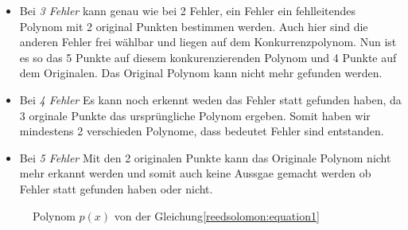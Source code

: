 \begin{beispiel}
\begin{itemize}
        Da der zweite Fehler frei wählbar ist, kann dieser auch auf dem Konkurrenzpolynom liegen, wie in der Abbilbung \ref{fig:polynom}.
        Nun haben wir, ein originles Polynom mit 5 übereinstimmenden und eine konkurrenzierendes mit 4 Punkten.
        Da 5 noch grösser als 4 ist, können wir sagen, welches das original Polynom ist.
    \item Bei \textit{3 Fehler} kann genau wie bei 2 Fehler, ein Fehler ein fehlleitendes Polynom mit 2 original Punkten bestimmen werden.
        Auch hier sind die anderen Fehler frei wählbar und liegen auf dem Konkurrenzpolynom.
        Nun ist es so das 5 Punkte auf diesem konkurenzierenden Polynom und 4 Punkte auf dem Originalen.
        Das Original Polynom kann nicht mehr gefunden werden.
    \item Bei \textit{4 Fehler} Es kann noch erkennt weden das Fehler statt gefunden haben, da 3 orginale Punkte das ursprüngliche Polynom ergeben.
        Somit haben wir mindestens 2 verschieden Polynome, dass bedeutet Fehler sind entstanden.
    \item Bei \textit{5 Fehler} Mit den 2 originalen Punkte kann das Originale Polynom nicht mehr erkannt werden und 
        somit auch keine Aussgae gemacht werden ob Fehler statt gefunden haben oder nicht.
\end{itemize}

\begin{figure}%
	\centering
    
	\caption{Polynom $p(x)$ von der Gleichung\eqref{reedsolomon:equation1}}
	\label{fig:polynom}
\end{figure}
\end{beispiel}

